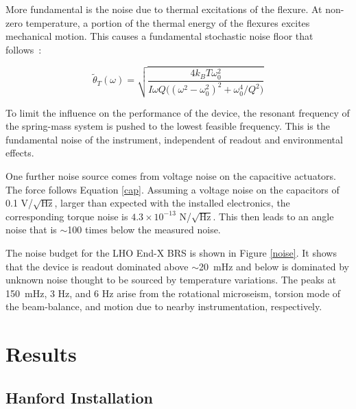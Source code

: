 \documentclass [12pt, proquest]{uwthesis}[2019]
\begin{document}
More fundamental is the noise due to thermal excitations of the flexure. At non-zero temperature, a portion of the thermal energy of the flexures excites mechanical motion. This causes a fundamental stochastic noise floor that follows~\cite{thermal}:

\begin{equation}
\tilde\theta_T(\omega)=\sqrt{\frac{4 k_B T \omega_0^2}{I \omega Q\big((\omega^2-\omega_0^2)^2+\omega_0^4/Q^2\big)}}
\end{equation}

To limit the influence on the performance of the device, the resonant frequency of the spring-mass system is pushed to the lowest feasible frequency. This is the fundamental noise of the instrument, independent of readout and environmental effects.

 One further noise source comes from voltage noise on the capacitive actuators. The force follows Equation \ref{cap}. Assuming a voltage noise on the capacitors of 0.1 V/$\sqrt{\text{Hz}}$, larger than expected with the installed electronics, the corresponding torque noise is $4.3 \times 10^{-13}$ N/$\sqrt{\text{Hz}}$. This then leads to an angle noise that is $\sim$100 times below the measured noise.

 The noise budget for the LHO End-X BRS is shown in Figure \ref{noise}. It shows that the device is readout dominated above $\sim$20~mHz and below is dominated by unknown noise thought to be sourced by temperature variations. The peaks at 150~mHz, 3 Hz, and 6 Hz arise from the rotational microseism, torsion mode of the beam-balance, and motion due to nearby instrumentation, respectively.

\section{Results}\label{results}
\subsection{Hanford Installation} \label{BRS_Hanford}
\end{document}
